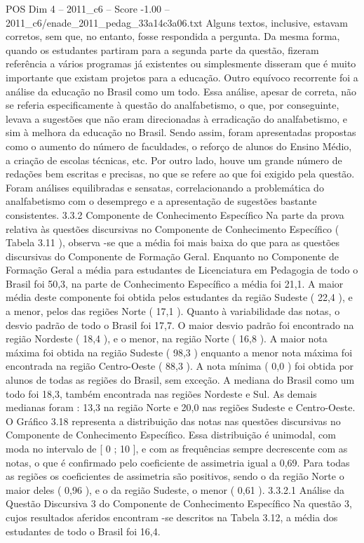 \begin{textsample}{POS Dim 4 – 2011\_c6 – Score -1.00 – 2011\_c6/enade\_2011\_pedag\_33a14c3a06.txt}
Alguns textos, inclusive, estavam corretos, sem que, no entanto, fosse respondida a pergunta.
Da mesma forma, quando os estudantes partiram para a segunda parte da questão, fizeram referência a vários programas já existentes ou simplesmente disseram que é muito importante que existam projetos para a educação.
Outro equívoco recorrente foi a análise da educação no Brasil como um todo.
Essa análise, apesar de correta, não se referia especificamente à questão do analfabetismo, o que, por conseguinte, levava a sugestões que não eram direcionadas à erradicação do analfabetismo, e sim à melhora da educação no Brasil.
Sendo assim, foram apresentadas propostas como o aumento do número de faculdades, o reforço de alunos do Ensino Médio, a criação de escolas técnicas, etc.
Por outro lado, houve um grande número de redações bem escritas e precisas, no que se refere ao que foi exigido pela questão.
Foram análises equilibradas e sensatas, correlacionando a problemática do analfabetismo com o desemprego e a apresentação de sugestões bastante consistentes. 3.3.2 Componente de Conhecimento Específico Na parte da prova relativa às questões discursivas no Componente de Conhecimento Específico ( Tabela 3.11 ), observa -se que a média foi mais baixa do que para as questões discursivas do Componente de Formação Geral.
Enquanto no Componente de Formação Geral a média para estudantes de Licenciatura em Pedagogia de todo o Brasil foi 50,3, na parte de Conhecimento Específico a média foi 21,1.
A maior média deste componente foi obtida pelos estudantes da região Sudeste ( 22,4 ), e a menor, pelos das regiões Norte ( 17,1 ).
Quanto à variabilidade das notas, o desvio padrão de todo o Brasil foi 17,7.
O maior desvio padrão foi encontrado na região Nordeste ( 18,4 ), e o menor, na região Norte ( 16,8 ).
A maior nota máxima foi obtida na região Sudeste ( 98,3 ) enquanto a menor nota máxima foi encontrada na região Centro-Oeste ( 88,3 ).
A nota mínima ( 0,0 ) foi obtida por alunos de todas as regiões do Brasil, sem exceção.
A mediana do Brasil como um todo foi 18,3, também encontrada nas regiões Nordeste e Sul.
As demais medianas foram : 13,3 na região Norte e 20,0 nas regiões Sudeste e Centro-Oeste.
O Gráfico 3.18 representa a distribuição das notas nas questões discursivas no Componente de Conhecimento Específico.
Essa distribuição é unimodal, com moda no intervalo de [ 0 ; 10 ], e com as frequências sempre decrescente com as notas, o que é confirmado pelo coeficiente de assimetria igual a 0,69.
Para todas as regiões os coeficientes de assimetria são positivos, sendo o da região Norte o maior deles ( 0,96 ), e o da região Sudeste, o menor ( 0,61 ). 3.3.2.1 Análise da Questão Discursiva 3 do Componente de Conhecimento Específico Na questão 3, cujos resultados aferidos encontram -se descritos na Tabela 3.12, a média dos estudantes de todo o Brasil foi 16,4.

\end{textsample}
